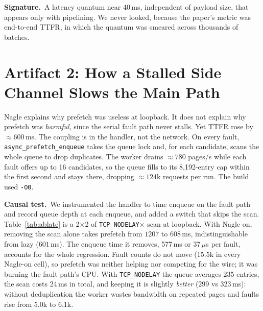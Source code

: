 \documentclass[conference]{IEEEtran}
\newcommand{\nd}{\texttt{TCP\_NODELAY}\xspace}
\newcommand{\us}{\,$\mu$s\xspace}
\begin{document}
\textbf{Signature.}\, A latency quantum near 40\,ms, independent of
payload size, that appears only with pipelining. We never looked, because
the paper's metric was end-to-end TTFR, in which the quantum was smeared
across thousands of batches.

\section{Artifact 2: How a Stalled Side Channel Slows the Main Path}
\label{sec:coupling}

Nagle explains why prefetch was useless at loopback. It does not explain
why prefetch was \emph{harmful}, since the serial fault path never stalls.
Yet TTFR rose by ${\approx}600$\,ms. The coupling is in the handler, not the
network. On every fault, \texttt{async\_prefetch\_enqueue} takes the queue
lock and, for each candidate, scans the whole queue to drop duplicates. The
worker drains ${\approx}780$ pages/s while each fault offers up to 16
candidates, so the queue fills to its 8{,}192-entry cap within the first
second and stays there, dropping ${\approx}124$k requests per run. The build
used \texttt{-O0}.

\textbf{Causal test.}\, We instrumented the handler to time enqueue on the
fault path and record queue depth at each enqueue, and added a switch that
skips the scan. Table~\ref{tab:ablate} is a 2$\times$2 of \nd $\times$ scan
at loopback. With Nagle on, removing the scan alone takes prefetch from
$1207$ to $608$\,ms, indistinguishable from lazy ($601$\,ms). The enqueue time
it removes, 577\,ms or 37\us per fault, accounts for the whole regression.
Fault counts do not move (15.5k in every Nagle-on cell), so prefetch was
neither helping nor competing for the wire; it was burning the fault path's
CPU. With \nd the queue averages 235 entries, the scan costs 24\,ms in total,
and keeping it is slightly \emph{better} ($299$ vs $323$\,ms): without
deduplication the worker wastes bandwidth on repeated pages and faults rise
from 5.0k to 6.1k.
\end{document}
